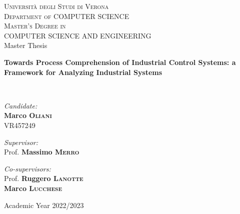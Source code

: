 \documentclass[a4paper,12pt,openright,twoside,titlepage]{book}
\newcommand{\thesistitle}{Towards Process Comprehension of Industrial Control Systems: a Framework for Analyzing Industrial Systems}
\newcommand{\supervisor}{Prof. \textbf{Massimo \textsc{Merro}}}
\newcommand{\firstcosupervisor}{Prof. \textbf{Ruggero \textsc{Lanotte}}}
\newcommand{\secondcosupervisor}{\textbf{Marco \textsc{Lucchese}}}
\newcommand{\candidate}{\textbf{Marco \textsc{Oliani}}\\VR457249}
\newcommand{\academicyear}{\large Academic Year 2022/2023}
\begin{document}
\begin{titlepage}
	\begin{center}
		\thispagestyle{empty}
		
		
		
		\textsc{\LARGE Università degli Studi di Verona}\\
		\textsc{Department of COMPUTER SCIENCE}\\[1.0cm]
		\textsc{\large Master's Degree in \\ 
			COMPUTER SCIENCE AND ENGINEERING}\\[1.5cm]
		
		\large Master Thesis \\[0.5cm]
		
		\hrulefill
		

		{ \Large\bfseries\thesistitle}
		
		\hrulefill \\[2.0cm]
		
		\begin{minipage}[t]{0.45\textwidth}
			\begin{flushleft} \large
				\emph{Candidate:} \\
				\candidate
			\end{flushleft}
		\end{minipage}
		\begin{minipage}[t]{0.45\textwidth}\raggedleft
			\begin{flushright} \large
				\emph{Supervisor:}\\
				\supervisor 
			\end{flushright}
			\begin{flushright} \large
				\emph{Co-supervisors:}\\
				\firstcosupervisor \\
				\secondcosupervisor
			\end{flushright}
		\end{minipage}
		
		\vfill
		
		\academicyear
		
	\end{center}
\end{titlepage}
\end{document}

